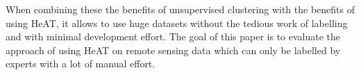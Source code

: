 When combining these the benefits of unsupervised clustering with the benefits of using \gls{HeAT}, it allows to use huge datasets without the tedious work of labelling and with minimal development effort.
The goal of this paper is to evaluate the approach of using \gls{HeAT} on remote sensing data which can only be labelled by experts with a lot of manual effort.
